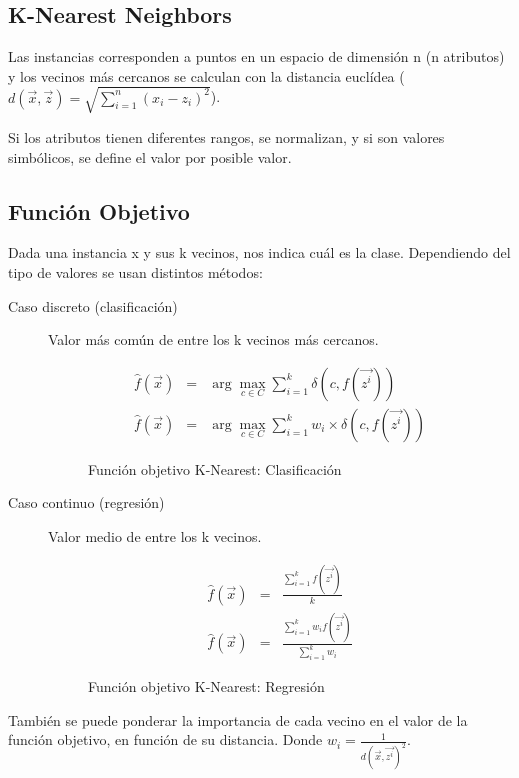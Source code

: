 \documentclass[12pt, twoside, openright]{report} %
\begin{document}
\subsection{K-Nearest Neighbors}
Las instancias corresponden a puntos en un espacio de dimensión n (n atributos) y los vecinos más cercanos se calculan con la distancia euclídea ($d\left( \vec{x},\vec{z}\right)   = \sqrt {\sum _{i=1}^{n}  \left( x_{i}-z_{i}\right)^2 }$).

Si los atributos tienen diferentes rangos, se normalizan, y si son valores simbólicos, se define el valor por posible valor.
\subsection{Función Objetivo}
Dada una instancia x y sus k vecinos, nos indica cuál es la clase. Dependiendo del tipo de valores se usan distintos métodos:
\begin{description}
	\item[Caso discreto (clasificación)] Valor más común de entre los k vecinos más cercanos.
	      \begin{figure}[H]
		      \begin{eqnarray}
			      \hat{f}(\vec{x}) &=& \arg\max _{c \in C} \sum^k_{i=1} \delta(c,f(\vec{z^i})) \\
			      \hat{f}(\vec{x}) &=& \arg\max _{c \in C} \sum^k_{i=1} w_i \times \delta(c,f(\vec{z^i}))
		      \end{eqnarray}
		      \captionsetup{justification=centering}
		      \caption{Función objetivo K-Nearest: Clasificación}
	      \end{figure}
	\item[Caso continuo (regresión)] Valor medio de entre los k vecinos.
	      \begin{figure}[H]
		      \begin{eqnarray}
			      \hat{f}(\vec{x}) &=& \frac{\sum^k_{i=1} f(\vec{z^i})}{k}\\
			      \hat{f}(\vec{x}) &=& \frac{\sum^k_{i=1} w_i f(\vec{z^i})}{\sum^k_{i=1} w_i}
		      \end{eqnarray}
		      \captionsetup{justification=centering}
		      \caption{Función objetivo K-Nearest: Regresión}
	      \end{figure}
\end{description}
También se puede ponderar la importancia de cada vecino en el valor de la función objetivo, en función de su distancia. Donde $w_i = \frac{1}{d(\vec{x},\vec{z^i})^2}$.
\end{document}
